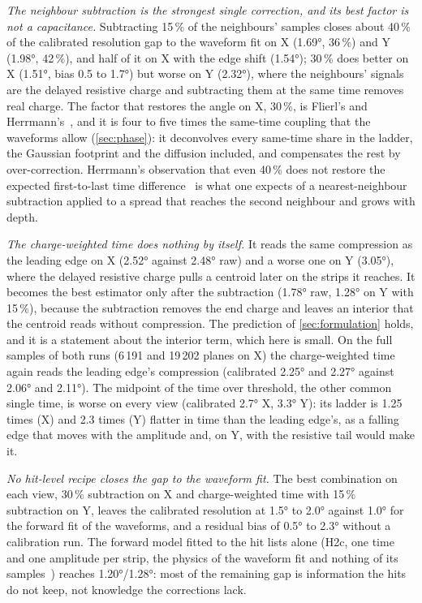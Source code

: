 \emph{The neighbour subtraction is the strongest single correction, and its best factor is not a capacitance.} Subtracting
15\,\% of the neighbours' samples closes about 40\,\% of the calibrated resolution gap to the waveform fit on X (\ang{1.69},
36\,\%) and Y (\ang{1.98}, 42\,\%), and half of it on X with the edge shift (\ang{1.54}); 30\,\% does better on X
(\ang{1.51}, bias 0.5 to \ang{1.7}) but worse on Y (\ang{2.32}), where the neighbours' signals are the delayed resistive charge and
subtracting them at the same time removes real charge. The factor that restores the angle on X, 30\,\%, is Flierl's and
Herrmann's~\cite{Flierl2018,Herrmann2019}, and it is four to five times the same-time coupling that the waveforms allow
(\cref{sec:phase}): it deconvolves every same-time share in the ladder, the Gaussian footprint and the diffusion included, and
compensates the rest by over-correction. Herrmann's observation that even 40\,\% does not restore the expected first-to-last
time difference~\cite{Herrmann2019} is what one expects of a nearest-neighbour subtraction applied to a spread that reaches the
second neighbour and grows with depth.

\emph{The charge-weighted time does nothing by itself.} It reads the same compression as the leading edge on X (\ang{2.52} against
\ang{2.48} raw) and a worse one on Y (\ang{3.05}), where the delayed resistive charge pulls a centroid later on the strips it
reaches. It becomes the best estimator only after the subtraction (\ang{1.78} raw, \ang{1.28} on Y with 15\,\%), because the
subtraction removes the end charge and leaves an interior that the centroid reads without compression. The prediction of
\cref{sec:formulation} holds, and it is a statement about the interior term, which here is small. On the full samples of both runs (6\,191 and
19\,202 planes on X) the charge-weighted time again reads the leading edge's compression (calibrated \ang{2.25} and \ang{2.27}
against \ang{2.06} and \ang{2.11}). The midpoint of the time over threshold, the other common single time, is worse on every
view (calibrated \ang{2.7} X, \ang{3.3} Y): its ladder is 1.25 times (X) and 2.3 times (Y) flatter in time than the leading edge's,
as a falling edge that moves with the amplitude and, on Y, with the resistive tail would make it.

\emph{No hit-level recipe closes the gap to the waveform fit.} The best combination on each view, 30\,\% subtraction on X and
charge-weighted time with 15\,\% subtraction on Y, leaves the calibrated resolution at \ang{1.5} to \ang{2.0} against \ang{1.0} for the
forward fit of the waveforms, and a residual bias of \ang{0.5} to \ang{2.3} without a calibration run. The forward model fitted
to the hit lists alone (H2c, one time and one amplitude per strip, the physics of the waveform fit and nothing of its
samples~\cite{paperII}) reaches \ang{1.20}/\ang{1.28}: most of the remaining gap is information the hits do not keep, not
knowledge the corrections lack.

